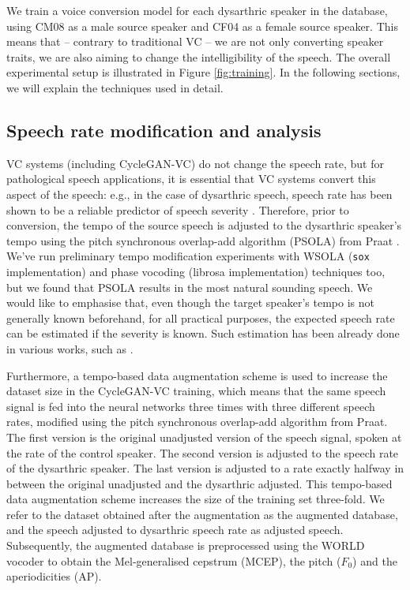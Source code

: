 \documentclass[a4paper]{article}
\begin{document}
We train a voice conversion model for each dysarthric speaker in the database, using CM08 as a male source speaker and CF04 as a female source speaker. %
This means that -- contrary to traditional VC -- we are not only converting speaker traits, we are also aiming to change the intelligibility of the speech. The overall experimental setup is illustrated in Figure \ref{fig:training}. In the following sections, we will explain the techniques used in detail.

\subsection{Speech rate modification and analysis}

VC systems (including CycleGAN-VC) do not change the speech rate, but for pathological speech applications, it is essential that VC systems convert this aspect of the speech: e.g., in the case of dysarthric speech, speech rate has been shown to be a reliable predictor of speech severity \cite{vachhani2018data}. Therefore, prior to conversion, the tempo of the source speech is adjusted to the dysarthric speaker's tempo using the pitch synchronous overlap-add algorithm (PSOLA) \cite{moulines1990pitch} from Praat \cite{boersma2011praat}. We've run preliminary tempo modification experiments with WSOLA (\texttt{sox} implementation) and phase vocoding (librosa \cite{brian_mcfee_2020_3955228} implementation) techniques too, but we found that PSOLA results in the most natural sounding speech. We would like to emphasise that, even though the target speaker's tempo is not generally known beforehand, for all practical purposes, the expected speech rate can be estimated if the severity is known. Such estimation has been already done in various works, such as \cite{xiong2019phonetic, vachhani2018data, 10.1007/978-3-319-43958-7_44}.






Furthermore, a tempo-based data augmentation scheme is used to increase the dataset size in the CycleGAN-VC training, which means that the same speech signal is fed into the neural networks three times with three different speech rates, modified using the pitch synchronous overlap-add algorithm from Praat. The first version is the original unadjusted version of the speech signal, spoken at the rate of the control speaker. The second version is adjusted to the speech rate of the dysarthric speaker. The last version is adjusted to a rate exactly halfway in between the original unadjusted and the dysarthric adjusted. This tempo-based data augmentation scheme increases the size of the training set three-fold.  We refer to the dataset obtained after the augmentation as the augmented database, and the speech adjusted to dysarthric speech rate as adjusted speech. Subsequently, the augmented database is preprocessed using the WORLD vocoder \cite{morise2016world} to obtain the Mel-generalised cepstrum (MCEP), the pitch ($F_0$) and the aperiodicities (AP). 
\end{document}
